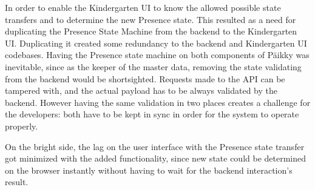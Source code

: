 
In order to enable the Kindergarten UI to know the allowed possible state transfers and to determine the new Presence state. This resulted as a need for duplicating the Presence State Machine from the backend to the Kindergarten UI. Duplicating it created some redundancy to the backend and Kindergarten UI codebases. Having the Presence state machine on both components of Päikky was inevitable, since as the keeper of the master data, removing the state validating from the backend would be shortsighted. Requests made to the API can be tampered with, and the actual payload has to be always validated by the backend. However having the same validation in two places creates a challenge for the developers: both have to be kept in sync in order for the system to operate properly. 

On the bright side, the lag on the user interface with the Presence state transfer got minimized with the added functionality, since new state could be determined on the browser instantly without having to wait for the backend interaction's result.




















